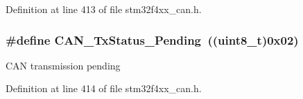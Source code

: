 Definition at line 413 of file stm32f4xx\-\_\-can.\-h.

\hypertarget{group___c_a_n__transmit__constants_ga9678a3a51379422868083608c7394409}{
\subsubsection[{C\-A\-N\-\_\-\-Tx\-Status\-\_\-\-Pending}]{\setlength{\rightskip}{0pt plus 5cm}\#define C\-A\-N\-\_\-\-Tx\-Status\-\_\-\-Pending~((uint8\-\_\-t)0x02)}}\label{group___c_a_n__transmit__constants_ga9678a3a51379422868083608c7394409}
C\-A\-N transmission pending 

Definition at line 414 of file stm32f4xx\-\_\-can.\-h.


